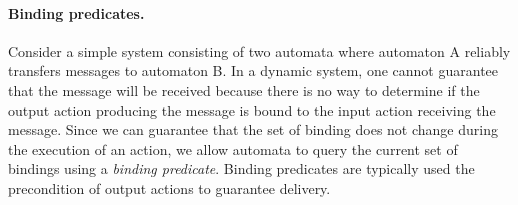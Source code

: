 
\paragraph*{Binding predicates.}
Consider a simple system consisting of two automata where automaton A reliably transfers messages to automaton B.
In a dynamic system, one cannot guarantee that the message will be received because there is no way to determine if the output action producing the message is bound to the input action receiving the message.
Since we can guarantee that the set of binding does not change during the execution of an action, we allow automata to query the current set of bindings using a \emph{binding predicate}.
Binding predicates are typically used the precondition of output actions to guarantee delivery.
